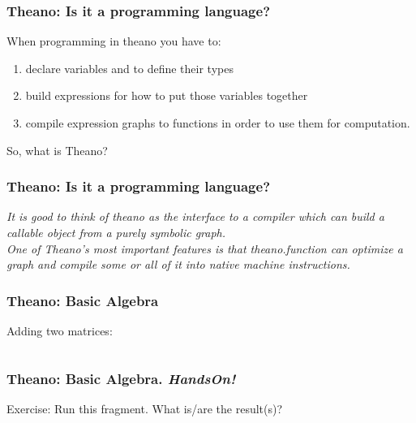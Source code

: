 \documentclass[aspectratio=169]{beamer}
\begin{document}
\begin{frame}
\frametitle{Theano: Is it a programming language?}
When programming in theano you have to:
\begin{enumerate}
\item  declare variables and to define their types
\item  build expressions for how to put those variables together
\item  compile expression graphs to functions in order to use them for computation.
\end{enumerate}
So, what is Theano?
\end{frame}

\begin{frame}
\frametitle{Theano: Is it a programming language?}
\emph{It is good to think of theano as the interface to a compiler which can build a callable object from a purely symbolic graph. 
\\[1.0cm]
One of Theano’s most important features is that theano.function can optimize a graph and compile some or all of it into native machine instructions. }
\end{frame}

\begin{frame}
\frametitle{Theano: Basic Algebra}
Adding two matrices:
\inputminted{python}{./aux_files/t5.py}
\end{frame}

\begin{frame}
\frametitle{Theano: Basic Algebra. \textit{HandsOn!} }
Exercise: Run this fragment. What is/are the result(s)?  
\\[0.5cm]
\inputminted{python}{./aux_files/t6.py}
\end{frame}
\end{document}
